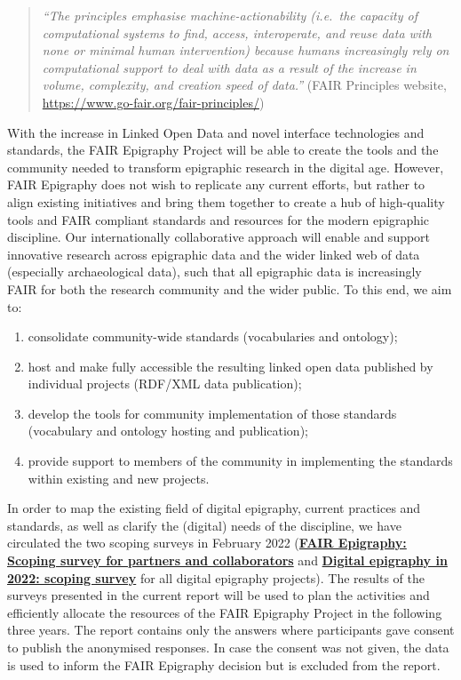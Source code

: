 \documentclass[
  12pt,
]{scrreprt}
\providecommand{\tightlist}{%
  \setlength{\itemsep}{0pt}\setlength{\parskip}{0pt}}
\begin{document}
\begin{quote}
\emph{``The principles emphasise machine-actionability (i.e.~the
capacity of computational systems to find, access, interoperate, and
reuse data with none or minimal human intervention) because humans
increasingly rely on computational support to deal with data as a result
of the increase in volume, complexity, and creation speed of data.''}
(FAIR Principles website,
\url{https://www.go-fair.org/fair-principles/})
\end{quote}

With the increase in Linked Open Data and novel interface technologies
and standards, the FAIR Epigraphy Project will be able to create the
tools and the community needed to transform epigraphic research in the
digital age. However, FAIR Epigraphy does not wish to replicate any
current efforts, but rather to align existing initiatives and bring them
together to create a hub of high-quality tools and FAIR compliant
standards and resources for the modern epigraphic discipline. Our
internationally collaborative approach will enable and support
innovative research across epigraphic data and the wider linked web of
data (especially archaeological data), such that all epigraphic data is
increasingly FAIR for both the research community and the wider public.
To this end, we aim to:

\begin{enumerate}
\def\labelenumi{\arabic{enumi}.}
\tightlist
\item
  consolidate community-wide standards (vocabularies and ontology);
\item
  host and make fully accessible the resulting linked open data
  published by individual projects (RDF/XML data publication);
\item
  develop the tools for community implementation of those standards
  (vocabulary and ontology hosting and publication);
\item
  provide support to members of the community in implementing the
  standards within existing and new projects.
\end{enumerate}

In order to map the existing field of digital epigraphy, current
practices and standards, as well as clarify the (digital) needs of the
discipline, we have circulated the two scoping surveys in February 2022
(\href{https://github.com/FAIR-epigraphy/scoping_survey_report/data/01_Survey_partners_questions.pdf}{\textbf{FAIR
Epigraphy: Scoping survey for partners and collaborators}} and
\href{https://github.com/FAIR-epigraphy/scoping_survey_report/data/02_Survey_projects_questions.pdf}{\textbf{Digital
epigraphy in 2022: scoping survey}} for all digital epigraphy projects).
The results of the surveys presented in the current report will be used
to plan the activities and efficiently allocate the resources of the
FAIR Epigraphy Project in the following three years. The report contains
only the answers where participants gave consent to publish the
anonymised responses. In case the consent was not given, the data is
used to inform the FAIR Epigraphy decision but is excluded from the
report.
\end{document}

